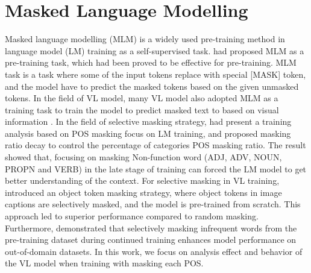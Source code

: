 \section{Masked Language Modelling}
Masked language modelling (MLM) is a widely used pre-training method in language model (LM) training \cite{bert, albert, dictbert, opt, realm} as a self-supervised task.
 had proposed MLM as a pre-training task, which had been proved to be effective for pre-training.
MLM task is a task where some of the input tokens replace with special [MASK] token, and the model have to predict the masked tokens based on the given unmasked tokens.
In the field of VL model, many VL model also adopted MLM as a training task to train the model to predict masked text to based on visual information \cite{albef, mplug, uniter, beit-3}.
In the field of selective masking strategy,  had present a training analysis based on POS masking focus on LM training, and proposed masking ratio decay to control the percentage of categories POS masking ratio.
The result showed that, focusing on masking Non-function word (ADJ, ADV, NOUN, PROPN and VERB) in the late stage of training can forced the LM model to get better understanding of the context. 
For selective masking in VL training,  introduced an object token masking strategy, where object tokens in image captions are selectively masked, and the model is pre-trained from scratch.
This approach led to superior performance compared to random masking.
Furthermore,  demonstrated that selectively masking infrequent words from the pre-training dataset during continued training enhances model performance on out-of-domain datasets.
In this work, we focus on analysis effect and behavior of the VL model when training with masking each POS.


